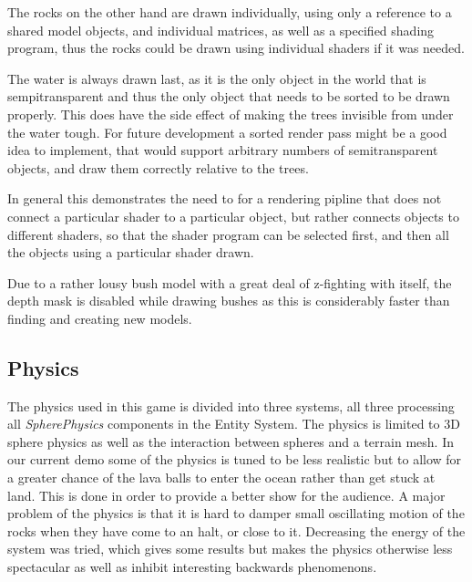 The rocks on the other hand are drawn individually, using only a reference to a shared model objects, and individual matrices, as well as a specified shading program, thus the rocks could be drawn using individual shaders if it was needed.

The water is always drawn last, as it is the only object in the world that is sempitransparent and thus the only object that needs to be sorted to be drawn properly. This does have the side effect of making the trees invisible from under the water tough. For future development a sorted render pass might be a good idea to implement, that would support arbitrary numbers of semitransparent objects, and draw them correctly relative to the trees.

In general this demonstrates the need to for a rendering pipline that does not connect a particular shader to a particular object, but rather connects objects to different shaders, so that the shader program can be selected first, and then all the objects using a particular shader drawn.

Due to a rather lousy bush model with a great deal of z-fighting with itself, the depth mask is disabled while drawing bushes as this is considerably faster than finding and creating new models.

\newpage
\subsection{Physics}
The physics used in this game is divided into three systems, all three processing all \textit{SpherePhysics} components in the Entity System. The physics is limited to 3D sphere physics as well as the interaction between spheres and a terrain mesh. In our current demo some of the physics is tuned to be less realistic but to allow for a greater chance of the lava balls to enter the ocean rather than get stuck at land. This is done in order to provide a better show for the audience. A major problem of the physics is that it is hard to damper small oscillating motion of the rocks when they have come to an halt, or close to it. Decreasing the energy of the system was tried, which gives some results but makes the physics otherwise less spectacular as well as inhibit interesting backwards phenomenons.

